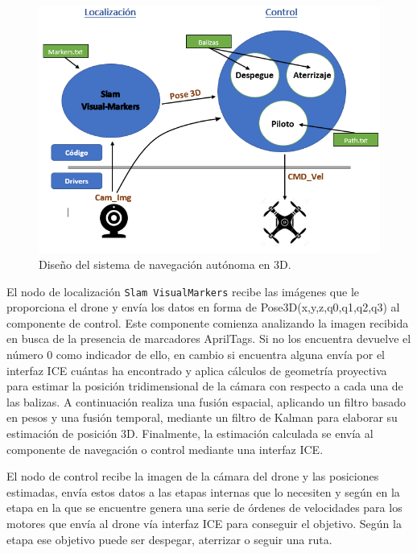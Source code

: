\begin{figure}[H]
	\begin{center}
		\includegraphics[width=1.1\textwidth]{imag/IMG31.PNG}
				\caption{Diseño del sistema de navegación autónoma en 3D.}
		\label{fig:Esquema representativo.}	
	\end{center}
\end{figure}

\hspace{1cm} El nodo de localización \texttt{Slam VisualMarkers} recibe las imágenes que le proporciona el drone y envía los datos en forma de Pose3D(x,y,z,q0,q1,q2,q3) al componente de control. Este componente comienza analizando la imagen recibida en busca de la presencia de marcadores AprilTags. Si no los encuentra devuelve el número 0 como indicador de ello, en cambio si encuentra alguna envía por el interfaz ICE cuántas ha encontrado y aplica cálculos de geometría proyectiva para estimar la posición tridimensional de la cámara con respecto a cada una de las balizas. A continuación realiza una fusión espacial, aplicando un filtro basado en pesos y una fusión temporal, mediante un filtro de Kalman para elaborar su estimación de posición 3D. Finalmente, la estimación calculada se envía al componente de navegación o control mediante una interfaz ICE.

\hspace{1cm} El nodo de control recibe la imagen de la cámara del drone y las posiciones estimadas, envía estos datos a las etapas internas que lo necesiten y según en la etapa en la que se encuentre genera una serie de órdenes de velocidades para los motores que envía al drone vía interfaz ICE para conseguir el objetivo. Según la etapa ese objetivo puede ser despegar, aterrizar o seguir una ruta.

